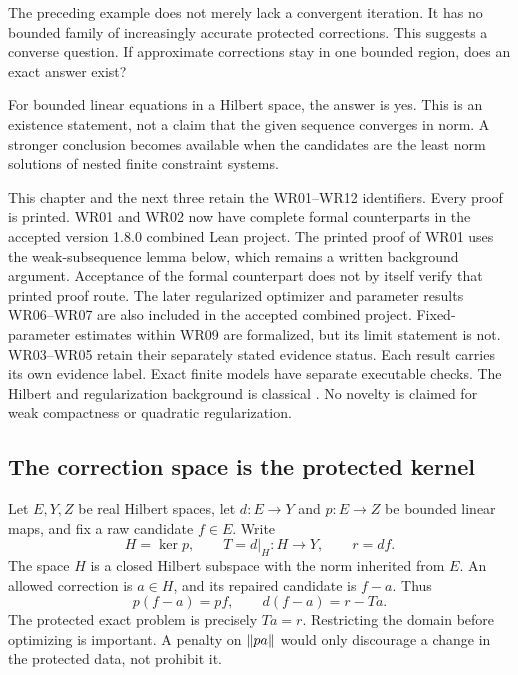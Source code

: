 \clearpage
{}\label{sec:bounded-realization}
The preceding example does not merely lack a convergent iteration. It has no bounded family of increasingly accurate protected corrections. This suggests a converse question. If approximate corrections stay in one bounded region, does an exact answer exist?

For bounded linear equations in a Hilbert space, the answer is yes. This is an existence statement, not a claim that the given sequence converges in norm. A stronger conclusion becomes available when the candidates are the least norm solutions of nested finite constraint systems.

\begin{scopebox}
This chapter and the next three retain the WR01--WR12 identifiers. Every proof is printed. WR01 and WR02 now have complete formal counterparts in the accepted version 1.8.0 combined Lean project. The printed proof of WR01 uses the weak-subsequence lemma below, which remains a written background argument. Acceptance of the formal counterpart does not by itself verify that printed proof route. The later regularized optimizer and parameter results WR06--WR07 are also included in the accepted combined project. Fixed-parameter estimates within WR09 are formalized, but its limit statement is not. WR03--WR05 retain their separately stated evidence status. Each result carries its own evidence label. Exact finite models have separate executable checks. The Hilbert and regularization background is classical \cite{clason-inverse}. No novelty is claimed for weak compactness or quadratic regularization.
\end{scopebox}

\subsection{The correction space is the protected kernel}
Let $E,Y,Z$ be real Hilbert spaces, let $d:E\to Y$ and $p:E\to Z$ be bounded linear maps, and fix a raw candidate $f\in E$. Write
\[
 H=\ker p,\qquad T=d|_H:H\to Y,\qquad r=df.
\]
The space $H$ is a closed Hilbert subspace with the norm inherited from $E$. An allowed correction is $a\in H$, and its repaired candidate is $f-a$. Thus
\[
 p(f-a)=pf,\qquad d(f-a)=r-Ta.
\]
The protected exact problem is precisely $Ta=r$. Restricting the domain before optimizing is important. A penalty on $\left\lVert pa\right\rVert$ would only discourage a change in the protected data, not prohibit it.

